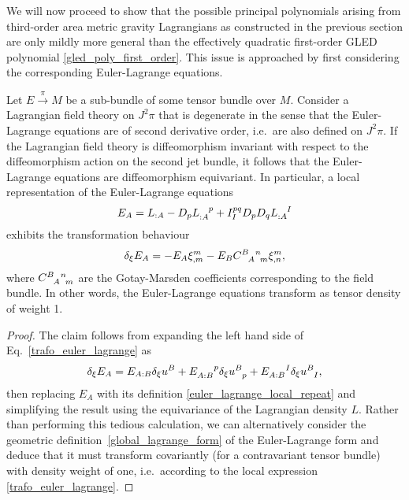 We will now proceed to show that the possible principal polynomials arising from third-order area metric gravity Lagrangians as constructed in the previous section are only mildly more general than the effectively quadratic first-order GLED polynomial \eqref{gled_poly_first_order}. This issue is approached by first considering the corresponding Euler-Lagrange equations.

\begin{proposition}\label{prop_euler_tensor}
  Let $E\overset{\pi}{\longrightarrow}M$ be a sub-bundle of some tensor bundle over $M$. Consider a Lagrangian field theory on $J^2\pi$ that is degenerate in the sense that the Euler-Lagrange equations are of second derivative order, i.e.~are also defined on $J^2\pi$. If the Lagrangian field theory is diffeomorphism invariant with respect to the diffeomorphism action on the second jet bundle, it follows that the Euler-Lagrange equations are diffeomorphism equivariant. In particular, a local representation of the Euler-Lagrange equations
  \begin{equation}\label{euler_lagrange_local_repeat}
  E_A = L_{:A} - D_p L_{:A}^{\hphantom{:A}p} + I_I^{pq} D_p D_q L_{:A}^{\hphantom{:A}I}
  \end{equation}
  exhibits the transformation behaviour
  \begin{equation}\label{trafo_euler_lagrange}
    \delta_\xi E_A = -E_A \xi^m_{,m} - E_B \gmc{B}{A}{n}{m} \xi^m_{,n},
  \end{equation}
  where $\gmc{B}{A}{n}{m}$ are the Gotay-Marsden coefficients corresponding to the field bundle. In other words, the Euler-Lagrange equations transform as tensor density of weight 1.
\end{proposition}
\begin{proof}
  The claim follows from expanding the left hand side of Eq.~\ref{trafo_euler_lagrange} as
  \begin{equation}
    \delta_\xi E_A = E_{A:B} \delta_\xi u^B + E_{A:B}^{\hphantom{A:B}p} \delta_\xi u^B_{\hphantom Bp} + E_{A:B}^{\hphantom{A:B}I} \delta_\xi u^B_{\hphantom BI},
  \end{equation}
  then replacing $E_A$ with its definition \eqref{euler_lagrange_local_repeat} and simplifying the result using the equivariance of the Lagrangian density $L$. Rather than performing this tedious calculation, we can alternatively consider the geometric definition~\ref{global_lagrange_form} of the Euler-Lagrange form and deduce that it must transform covariantly (for a contravariant tensor bundle) with density weight of one, i.e.~according to the local expression \eqref{trafo_euler_lagrange}.
\end{proof}
